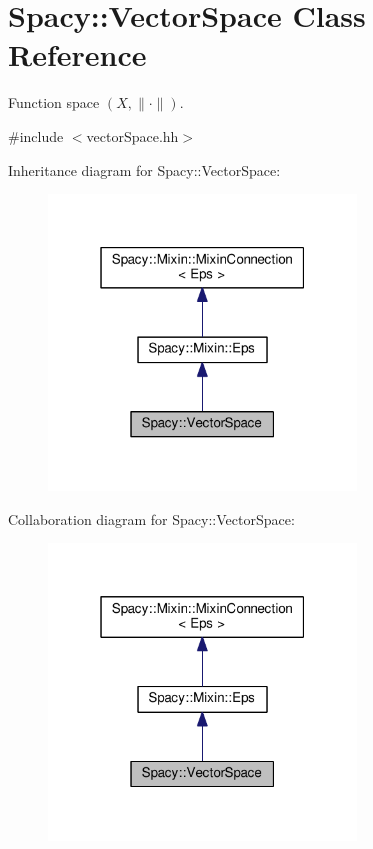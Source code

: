 \hypertarget{classSpacy_1_1VectorSpace}{}\section{Spacy\+:\+:Vector\+Space Class Reference}
\label{classSpacy_1_1VectorSpace}


Function space $(X,\|\cdot\|)$.  




{\ttfamily \#include $<$vector\+Space.\+hh$>$}



Inheritance diagram for Spacy\+:\+:Vector\+Space\+:\nopagebreak
\begin{figure}[H]
\begin{center}
\leavevmode
\includegraphics[width=232pt]{classSpacy_1_1VectorSpace__inherit__graph}
\end{center}
\end{figure}


Collaboration diagram for Spacy\+:\+:Vector\+Space\+:\nopagebreak
\begin{figure}[H]
\begin{center}
\leavevmode
\includegraphics[width=232pt]{classSpacy_1_1VectorSpace__coll__graph}
\end{center}
\end{figure}
